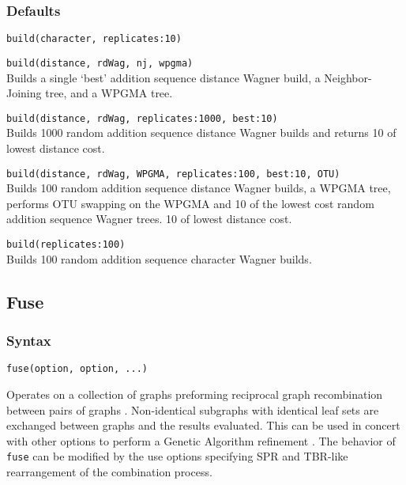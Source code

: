 	\subsubsection{Defaults}
		\texttt{build(character, replicates:10)}


	\begin{example}
	
		\item{\texttt{build(distance, rdWag, nj, wpgma)} \\ 
		Builds a single `best' addition sequence distance Wagner build, 
		a Neighbor-Joining tree, and a WPGMA tree.}
		
		\item{\texttt{build(distance, rdWag, replicates:1000, best:10)}\\
		Builds 1000 random addition sequence distance Wagner builds and returns 
		10 of lowest distance cost.}
	
		\item{\texttt{build(distance, rdWag, WPGMA, replicates:100, best:10, OTU)}\\
		Builds 100 random addition sequence distance Wagner builds, a WPGMA tree, 
		performs OTU swapping on the WPGMA and 10 of the lowest cost random addition 
		sequence Wagner trees. 
		10 of lowest distance cost.}
	
		\item{\texttt{build(replicates:100)} \\
		Builds 100 random addition sequence character Wagner builds.}

	\end{example}

\subsection{Fuse}
	\subsubsection{Syntax}
		\texttt{fuse(option, option, ...)}
		
	\begin{phygdescription}
		{Operates on a collection of graphs preforming reciprocal graph recombination between pairs of 
		graphs \citep{moilanen1999, moilanen2001, goloboff1999}. Non-identical subgraphs with identical 
		leaf sets are exchanged between graphs and the results evaluated. This can be used in concert 
		with other options to perform a Genetic Algorithm refinement \citep{Holland1975}. The behavior of 
		\texttt{fuse} can be modified by the use options specifying SPR and TBR-like rearrangement of the 
		combination process.}
	\end{phygdescription}
	
